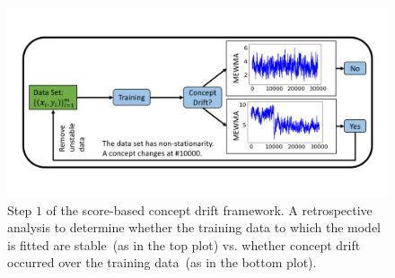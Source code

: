 \documentclass[twoside,11pt]{article}
\begin{document}


\begin{figure}[!htbp]
\centering
\includegraphics[width = 1\linewidth, trim=.35in .68in .35in .69in, clip]{../figures/v14/flow_chart/Retrospective_2.png}
\caption{Step $1$ of the score-based concept drift framework. A retrospective analysis to determine whether the training data to which the model is fitted are stable~(as in the top plot) vs. whether concept drift occurred over the training data~(as in the bottom plot).}
  \label{fig:proc_mon_score_retro}
\end{figure}
\end{document}
